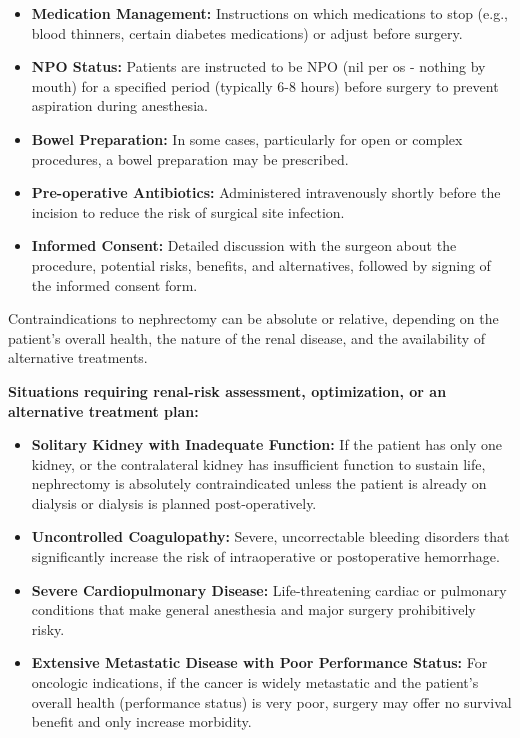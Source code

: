 \begin{itemize}
  \item \textbf{Medication Management:} Instructions on which medications to stop (e.g., blood thinners, certain diabetes medications) or adjust before surgery.
  \item \textbf{NPO Status:} Patients are instructed to be NPO (nil per os - nothing by mouth) for a specified period (typically 6-8 hours) before surgery to prevent aspiration during anesthesia.
  \item \textbf{Bowel Preparation:} In some cases, particularly for open or complex procedures, a bowel preparation may be prescribed.
  \item \textbf{Pre-operative Antibiotics:} Administered intravenously shortly before the incision to reduce the risk of surgical site infection.
  \item \textbf{Informed Consent:} Detailed discussion with the surgeon about the procedure, potential risks, benefits, and alternatives, followed by signing of the informed consent form.
\end{itemize}

Contraindications to nephrectomy can be absolute or relative, depending on the patient's overall health, the nature of the renal disease, and the availability of alternative treatments.

\textbf{Situations requiring renal-risk assessment, optimization, or an alternative treatment plan:}
\begin{itemize}
  \item \textbf{Solitary Kidney with Inadequate Function:} If the patient has only one kidney, or the contralateral kidney has insufficient function to sustain life, nephrectomy is absolutely contraindicated unless the patient is already on dialysis or dialysis is planned post-operatively.
  \item \textbf{Uncontrolled Coagulopathy:} Severe, uncorrectable bleeding disorders that significantly increase the risk of intraoperative or postoperative hemorrhage.
  \item \textbf{Severe Cardiopulmonary Disease:} Life-threatening cardiac or pulmonary conditions that make general anesthesia and major surgery prohibitively risky.
  \item \textbf{Extensive Metastatic Disease with Poor Performance Status:} For oncologic indications, if the cancer is widely metastatic and the patient's overall health (performance status) is very poor, surgery may offer no survival benefit and only increase morbidity.
\end{itemize}

